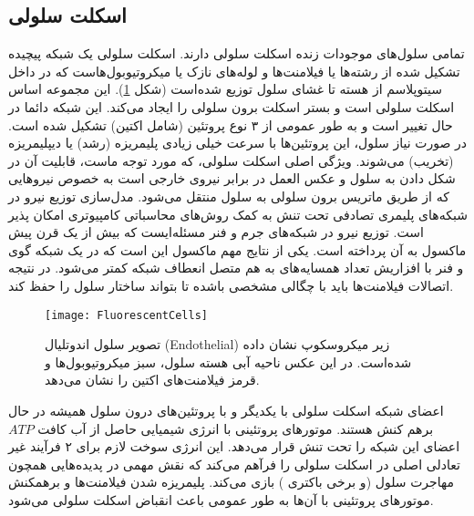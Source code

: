 \subsection{اسکلت سلولی}\label{lab:skeleton}
تمامی سلول‌های موجودات زنده اسکلت سلولی دارند. اسکلت سلولی یک شبکه پیچیده تشکیل شده از رشته‌ها یا فیلامنت‌ها و لوله‌های نازک یا میکروتیوبول‌هاست که در داخل سیتوپلاسم از هسته تا غشای سلول توزیع شده‌است (شکل \ref{fig:wiki-cyto})\cite{hardin2014becker,PhysRevLett.120.068001}. این مجموعه اساس اسکلت سلولی است و بستر اسکلت برون سلولی را ایجاد می‌کند. این شبکه دائما در حال تغییر است و به طور عمومی از ۳ نوع پروتئین (شامل اکتین) تشکیل شده است. در صورت نیاز سلول، این پروتئین‌ها با سرعت خیلی زیادی پلیمریزه (رشد) یا دیپلیمریزه (تخریب) می‌شوند. ویژگی اصلی اسکلت سلولی، که مورد توجه ماست، قابلیت آن در شکل دادن به سلول و عکس العمل در برابر نیرو‌ی خارجی است به خصوص نیروهایی که از طریق ماتریس برون سلولی به سلول منتقل می‌شود\cite{PhysRevLett.120.068001}. مدل‌سازی توزیع نیرو در شبکه‌های پلیمری تصادفی تحت تنش به کمک روش‌های محاسباتی کامپیوتری امکان پذیر است\cite{Heussinger2007}. توزیع نیرو در شبکه‌های جرم و فنر مسئله‌ایست که بیش از یک قرن پیش  ماکسول به آن پرداخته است. یکی از نتایج مهم ماکسول این است که در یک شبکه گوی و فنر با افزاریش تعداد همسایه‌های به هم متصل انعطاف شبکه کمتر می‌شود\cite{doi:10.1080/14786446408643668}. در نتیجه اتصالات فیلامنت‌ها باید با چگالی مشخصی باشده تا بتواند ساختار سلول را حفظ کند.




\begin{figure}[h]
\begin{center}
\texttt{[image: FluorescentCells]}
\caption{
تصویر سلول اندوتلیال (Endothelial) زیر میکروسکوپ نشان داده شده‌است. در این عکس  ناحیه آبی هسته سلول،‌ سبز میکروتیوبول‌ها و قرمز فیلامنت‌های اکتین را نشان می‌دهد.\cite{wiki-cell}
}
\label{fig:wiki-cyto}
\end{center}
\end{figure}
اعضای شبکه اسکلت سلولی با یکدیگر و با پروتئین‌های درون سلول همیشه در حال برهم کنش هستند. موتورهای پروتئینی با انرژی شیمیایی حاصل از آب کافت $ATP$ اعضای این شبکه را تحت تنش قرار می‌دهد. این انرژی سوخت لازم برای ۲ فرآیند غیر تعادلی اصلی در اسکلت سلولی را فرآهم می‌کند که نقش مهمی در پدیده‌هایی همچون مهاجرت سلول (و برخی باکتری \cite{Mignot853}) بازی می‌کند. پلیمریزه شدن فیلامنت‌ها و برهمکنش موتور‌های پروتئینی با آن‌ها به طور عمومی باعث انقباض اسکلت سلولی می‌شود\cite{Hawkins:2011eu}. 

